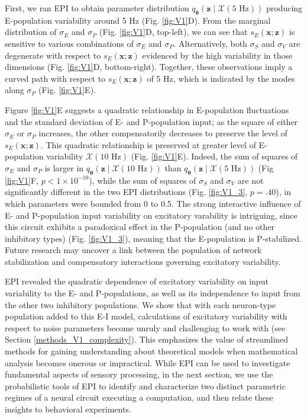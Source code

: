 \documentclass[11pt]{article}
\begin{document}
First, we ran EPI to obtain parameter distribution $q_{\bm{\theta}}(\mathbf{z} \mid \mathcal{X}(5\text{ Hz}))$ producing E-population variability around 5 Hz (Fig. \ref{fig:V1}D).
From the marginal distribution of $\sigma_E$ and $\sigma_P$ (Fig. \ref{fig:V1}D, top-left), we can see that $s_E(\mathbf{x}; \mathbf{z})$ is sensitive to various combinations of $\sigma_E$ and $\sigma_P$.
Alternatively, both $\sigma_S$ and $\sigma_V$ are degenerate with respect to $s_E(\mathbf{x}; \mathbf{z})$ evidenced by the high variability in those dimensions (Fig. \ref{fig:V1}D, bottom-right).
Together, these observations imply a curved path with respect to $s_E(\mathbf{x}; \mathbf{z})$ of 5 Hz, which is indicated by the modes along $\sigma_P$ (Fig. \ref{fig:V1}E).

Figure \ref{fig:V1}E suggests a quadratic relationship in E-population fluctuations and the standard deviation of E- and P-population input; as the square of either $\sigma_E$ or $\sigma_P$ increases, the other compensatorily decreases to preserve the level of $s_E(\mathbf{x}; \mathbf{z})$.
This quadratic relationship is preserved at greater level of E-population variability $\mathcal{X}(10\text{ Hz})$ (Fig. \ref{fig:V1}E).
Indeed, the sum of squares of $\sigma_E$ and $\sigma_P$ is larger in $q_{\bm{\theta}}(\mathbf{z} \mid \mathcal{X}(10\text{ Hz}))$ than $q_{\bm{\theta}}(\mathbf{z} \mid \mathcal{X}(5\text{ Hz}))$ (Fig \ref{fig:V1}F, $p < 1 \times 10^{-10}$), while the sum of squares of $\sigma_S$ and $\sigma_V$ are not significantly different in the two EPI distributions (Fig. \ref{fig:V1_3}, $p=.40$), in which parameters were bounded from 0 to 0.5.
The strong interactive influence of E- and P-population input variability on excitatory varability is intriguing, since this circuit exhibits a paradoxical effect in the P-population (and no other inhibitory types) (Fig. \ref{fig:V1_3}), meaning that the E-population is P-stabilized.
Future research may uncover a link between the population of network stabilization and compensatory interactions governing excitatory variability.

EPI revealed the quadratic dependence of excitatory variability on input variability to the E- and P-populations, as well as its independence to input from the other two inhibitory populations.
We show that with each neuron-type population added to this E-I model, calculations of excitatory variability with respect to noise parameters become unruly and challenging to work with (see Section \ref{methods_V1_complexity}).
This emphasizes the value of streamlined methods for gaining understanding about theoretical models when mathematical analysis becomes onerous or impractical.
While EPI can be used to investigate fundamental aspects of sensory processing, in the next section, we use the probabilistic tools of EPI to identify and characterize two distinct parametric regimes of a neural circuit executing a computation, and then relate these insights to  behavioral experiments.
\end{document}
